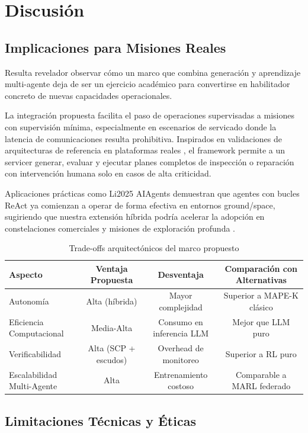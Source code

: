\section{Discusión}

\subsection{Implicaciones para Misiones Reales}

Resulta revelador observar cómo un marco que combina generación y aprendizaje multi-agente deja de ser un ejercicio académico para convertirse en habilitador concreto de nuevas capacidades operacionales. 

La integración propuesta facilita el paso de operaciones supervisadas a misiones con supervisión mínima, especialmente en escenarios de servicado donde la latencia de comunicaciones resulta prohibitiva. Inspirados en validaciones de arquitecturas de referencia en plataformas reales \cite{Basciani2026_RA}, el framework permite a un servicer generar, evaluar y ejecutar planes completos de inspección o reparación con intervención humana solo en casos de alta criticidad. 

Aplicaciones prácticas como Li2025 AIAgents demuestran que agentes con bucles ReAct ya comienzan a operar de forma efectiva en entornos ground/space, sugiriendo que nuestra extensión híbrida podría acelerar la adopción en constelaciones comerciales y misiones de exploración profunda \cite{Li2025_AIAgents}.

\begin{table}[t]
\centering
\caption{Trade-offs arquitectónicos del marco propuesto}
\label{tab:tradeoffs}
\begin{tabular}{lccc}
\hline
Aspecto & Ventaja Propuesta & Desventaja & Comparación con Alternativas \\
\hline
Autonomía & Alta (híbrida) & Mayor complejidad & Superior a MAPE-K clásico \\
Eficiencia Computacional & Media-Alta & Consumo en inferencia LLM & Mejor que LLM puro \\
Verificabilidad & Alta (SCP + escudos) & Overhead de monitoreo & Superior a RL puro \\
Escalabilidad Multi-Agente & Alta & Entrenamiento costoso & Comparable a MARL federado \\
\hline
\end{tabular}
\end{table}

\subsection{Limitaciones Técnicas y Éticas}

